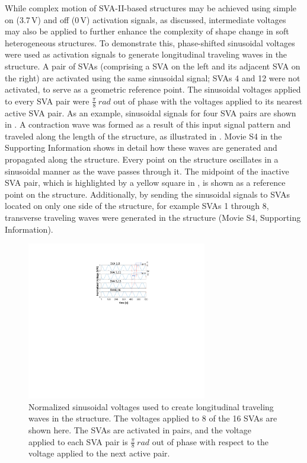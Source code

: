 While complex motion of SVA-II-based structures may be achieved using simple on (3.7\,V) and off (0\,V) activation signals, as discussed, intermediate voltages may also be applied to further enhance the complexity of shape change in soft heterogeneous structures. To demonstrate this, phase-shifted sinusoidal voltages were used as activation signals to generate longitudinal traveling waves in the structure. A pair of SVAs (comprising a SVA on the left and its adjacent SVA on the right) are activated using the same sinusoidal signal; SVAs 4 and 12 were not activated, to serve as a geometric reference point. The sinusoidal voltages applied to every SVA pair were $\frac{\pi}{8}~rad$ out of phase with the voltages applied to its nearest active SVA pair. As an example, sinusoidal signals for four SVA pairs are shown in  . A contraction wave was formed as a result of this input signal pattern and traveled along the length of the structure, as illustrated in . Movie S4 in the Supporting Information shows in detail how these waves are generated and propagated along the structure. Every point on the structure oscillates in a sinusoidal manner as the wave passes through it. The midpoint of the inactive SVA pair, which is highlighted by a yellow square in , is shown as a reference point on the structure. Additionally, by sending the sinusoidal signals to SVAs located on only one side of the structure, for example SVAs 1 through 8, transverse traveling waves were generated in the structure (Movie S4, Supporting Information).

\begin{figure}[!ht]
\centering
\includegraphics[width=0.7\textwidth]{sineWaves.pdf}
\caption[Normalized sinusoidal voltages]{Normalized sinusoidal voltages used to create longitudinal traveling waves in the structure. The voltages applied to 8 of the 16 SVAs are shown here. The SVAs are activated in pairs, and the voltage applied to each SVA pair is $\frac{\pi}{8}~rad$ out of phase with respect to the voltage applied to the next active pair.}
\label{fig:sineWaves}
\end{figure}

